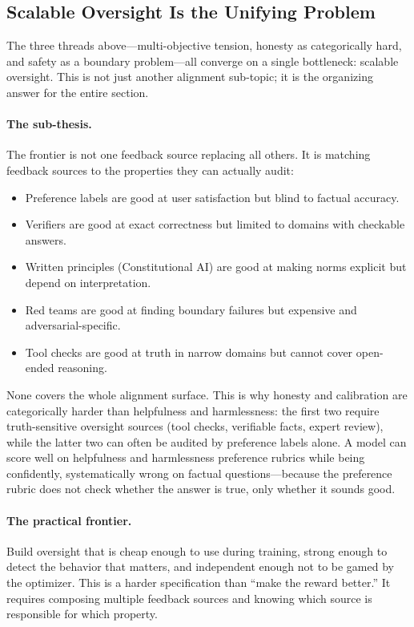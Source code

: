 \subsection{Scalable Oversight Is the Unifying Problem}

The three threads above---multi-objective tension, honesty as categorically hard, and safety as a boundary problem---all converge on a single bottleneck: scalable oversight. This is not just another alignment sub-topic; it is the organizing answer for the entire section.

\paragraph{The sub-thesis.} The frontier is not one feedback source replacing all others. It is matching feedback sources to the properties they can actually audit:

\begin{itemize}[nosep]
  \item Preference labels are good at user satisfaction but blind to factual accuracy.
  \item Verifiers are good at exact correctness but limited to domains with checkable answers.
  \item Written principles (Constitutional AI) are good at making norms explicit but depend on interpretation.
  \item Red teams are good at finding boundary failures but expensive and adversarial-specific.
  \item Tool checks are good at truth in narrow domains but cannot cover open-ended reasoning.
\end{itemize}

None covers the whole alignment surface. This is why honesty and calibration are categorically harder than helpfulness and harmlessness: the first two require truth-sensitive oversight sources (tool checks, verifiable facts, expert review), while the latter two can often be audited by preference labels alone. A model can score well on helpfulness and harmlessness preference rubrics while being confidently, systematically wrong on factual questions---because the preference rubric does not check whether the answer is true, only whether it sounds good.

\paragraph{The practical frontier.} Build oversight that is cheap enough to use during training, strong enough to detect the behavior that matters, and independent enough not to be gamed by the optimizer. This is a harder specification than ``make the reward better.'' It requires composing multiple feedback sources and knowing which source is responsible for which property.

